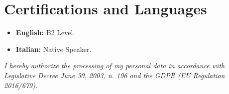 \documentclass[11pt, a4paper]{article}
\begin{document}
\section{Certifications and Languages}
\begin{itemize}
    \item \textbf{English:} B2 Level.
    \item \textbf{Italian:} Native Speaker.
\end{itemize}

\vfill
\begin{center}
\scriptsize{\textit{I hereby authorize the processing of my personal data in accordance with Legislative Decree June 30, 2003, n. 196 and the GDPR (EU Regulation 2016/679).}}
\end{center}
\end{document}
